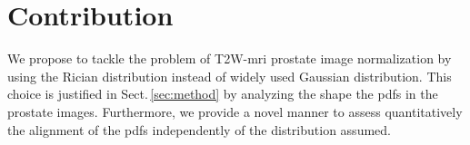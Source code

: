 \section{Contribution}

We propose to tackle the problem of T2W-\ac{mri} prostate image normalization by using the Rician distribution instead of widely used Gaussian distribution. This choice is justified in Sect.\,\ref{sec:method} by analyzing the shape the \ac{pdf}s in the prostate images. Furthermore, we provide a novel manner to assess quantitatively the alignment of the \ac{pdf}s independently of the distribution assumed. 


